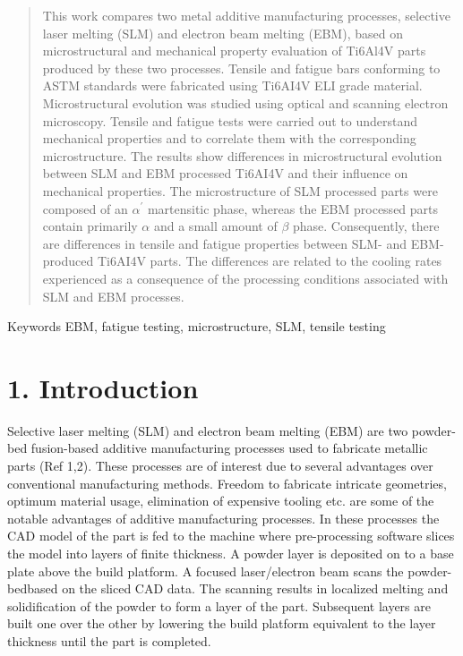 \documentclass[10pt]{article}
\begin{document}
\begin{abstract}
This work compares two metal additive manufacturing processes, selective laser melting (SLM) and electron beam melting (EBM), based on microstructural and mechanical property evaluation of Ti6Al4V parts produced by these two processes. Tensile and fatigue bars conforming to ASTM standards were fabricated using Ti6AI4V ELI grade material. Microstructural evolution was studied using optical and scanning electron microscopy. Tensile and fatigue tests were carried out to understand mechanical properties and to correlate them with the corresponding microstructure. The results show differences in microstructural evolution between SLM and EBM processed Ti6AI4V and their influence on mechanical properties. The microstructure of SLM processed parts were composed of an $\alpha^{\prime}$ martensitic phase, whereas the EBM processed parts contain primarily $\alpha$ and a small amount of $\beta$ phase. Consequently, there are differences in tensile and fatigue properties between SLM- and EBM-produced Ti6AI4V parts. The differences are related to the cooling rates experienced as a consequence of the processing conditions associated with SLM and EBM processes.
\end{abstract}

Keywords EBM, fatigue testing, microstructure, SLM, tensile testing

\section*{1. Introduction}
Selective laser melting (SLM) and electron beam melting (EBM) are two powder-bed fusion-based additive manufacturing processes used to fabricate metallic parts (Ref 1,2). These processes are of interest due to several advantages over conventional manufacturing methods. Freedom to fabricate intricate geometries, optimum material usage, elimination of expensive tooling etc. are some of the notable advantages of additive manufacturing processes. In these processes the CAD model of the part is fed to the machine where pre-processing software slices the model into layers of finite thickness. A powder layer is deposited on to a base plate above the build platform. A focused laser/electron beam scans the powder-bedbased on the sliced CAD data. The scanning results in localized melting and solidification of the powder to form a layer of the part. Subsequent layers are built one over the other by lowering the build platform equivalent to the layer thickness until the part is completed.
\end{document}
